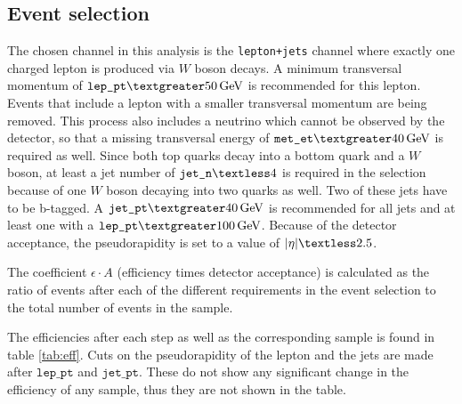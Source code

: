 \subsection{Event selection}
\label{sec:aufgabe3}
The chosen channel in this analysis is the \texttt{lepton+jets} channel where exactly one charged lepton is produced via $W$ boson decays.
A minimum transversal momentum of $\texttt{lep$\_$pt} \textgreater \SI{50}{\giga\electronvolt}$ is recommended for this lepton.
Events that include a lepton with a smaller transversal momentum are being removed.
This process also includes a neutrino which cannot be observed by the detector, so that a missing transversal energy of $\texttt{met$\_$et} \textgreater \SI{40}{\giga\electronvolt}$ is required as well.
Since both top quarks decay into a bottom quark and  a $W$ boson, at least a jet number of $\texttt{jet$\_$n} \textless 4$ is required in the selection because of one $W$ boson decaying into two quarks as well.
Two of these jets have to be b-tagged.
A $\texttt{jet$\_$pt} \textgreater \SI{40}{\giga\electronvolt}$ is recommended for all jets and at least one with a $\texttt{lep$\_$pt} \textgreater \SI{100}{\giga\electronvolt}$.
Because of the detector acceptance, the pseudorapidity is set to a value of $|{\eta}| \textless 2.5$. \par

The coefficient $\epsilon \cdot A$ (efficiency times detector acceptance) is calculated as the ratio of events after each of the different requirements in the event selection to the total number of events in the sample.

The efficiencies after each step as well as the corresponding sample is found in table \ref{tab:eff}.
Cuts on the pseudorapidity of the lepton and the jets are made after $\texttt{lep$\_$pt}$ and $\texttt{jet$\_$pt}$.
These do not show any significant change in the efficiency of any sample, thus they are not shown in the table.

